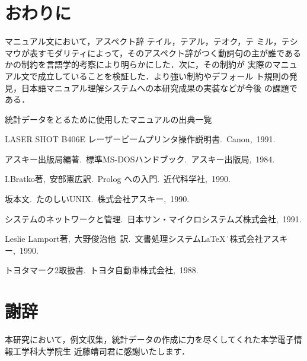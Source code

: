 {\section{おわりに}
\label{end}マニュアル文において，アスペクト辞 テイル，テアル，テオク，テ
ミル，テシマウが表すモダリティによって，そのアスペクト辞がつく動詞句の{\dg 主}が誰であるかの制約を言語学的考察により明らかにした．次に，その制約が
実際のマニュアル文で成立していることを検証した．より強い制約やデフォール
ト規則の発見，日本語マニュアル理解システムへの本研究成果の実装などが今後
の課題である．

\vspace{0.6cm}
\hspace*{-0.5cm}
{\large\dg 統計データをとるために使用したマニュアルの出典一覧} 
\vspace{0.2cm}

\hspace*{-0.5cm} LASER SHOT {\small B406E} レーザービームプリンタ操作説明書.\ Canon,\ 1991.
\vspace{0.2cm}

\hspace*{-0.5cm} アスキー出版局編著.\ 標準MS-DOSハンドブック.\ アスキー出版局,\ 1984.
\vspace{0.3cm}

\hspace*{-0.5cm} I.Bratko著,\ 安部憲広訳.\ Prolog への入門.\ 近代科学社,\ 1990.
\vspace{0.2cm}

\hspace*{-0.5cm} 坂本文.\ たのしいUNIX.\ 株式会社アスキー,\ 1990.
\vspace{0.2cm}

\hspace*{-0.5cm} システムのネットワークと管理.\ 日本サン・マイクロシステムズ株式会社,\ 1991.
\vspace{0.2cm}

\hspace*{-0.5cm} Leslie Lamport著,\ 大野俊治他\ 訳.\ 文書処理システム\LaTeX\.\ 株式会社アスキー,\ 1990.
\vspace{0.2cm}

\hspace*{-0.5cm} トヨタマーク2取扱書.\ トヨタ自動車株式会社,\ 1988.

\section*{謝辞}
本研究において，例文収集，統計データの作成に力を尽くしてくれた本学電子情
報工学科大学院生 近藤靖司君に感謝いたします．


}
